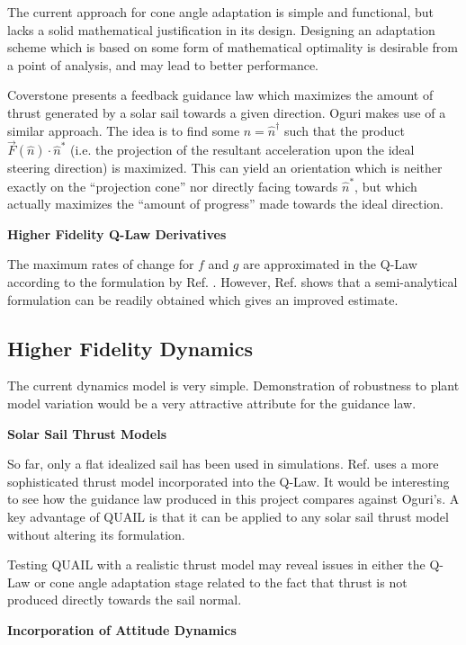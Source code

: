The current approach for cone angle adaptation is simple and functional, but lacks a solid mathematical justification in its design. Designing an adaptation scheme which is based on some form of mathematical optimality is desirable from a point of analysis, and may lead to better performance.

Coverstone \cite{coverstone2003technique} presents a feedback guidance law which maximizes the amount of thrust generated by a solar sail towards a given direction. Oguri \cite{oguri2023solar} makes use of a similar approach. The idea is to find some \(\hat{n} = \hat{n}^\dagger\) such that the product \(\vec{F}(\hat{n}) \cdot \hat{n}^*\) (i.e. the projection of the resultant acceleration upon the ideal steering direction) is maximized. This can yield an orientation which is neither exactly on the ``projection cone'' nor directly facing towards \(\hat{n}^*\), but which actually maximizes the ``amount of progress'' made towards the ideal direction.

\textbf{Higher Fidelity Q-Law Derivatives}

The maximum rates of change for \(f\) and \(g\) are approximated in the Q-Law according to the formulation by Ref. \cite{vargaperez2016}. However, Ref. \cite{sanjeev2023} shows that a semi-analytical formulation can be readily obtained which gives an improved estimate.

\subsection{Higher Fidelity Dynamics}
The current dynamics model is very simple. Demonstration of robustness to plant model variation would be a very attractive attribute for the guidance law.

\textbf{Solar Sail Thrust Models}

So far, only a flat idealized sail has been used in simulations. Ref. \cite{oguri2023solar} uses a more sophisticated thrust model incorporated into the Q-Law. It would be interesting to see how the guidance law produced in this project compares against Oguri's. A key advantage of QUAIL is that it can be applied to any solar sail thrust model without altering its formulation.

Testing QUAIL with a realistic thrust model may reveal issues in either the Q-Law or cone angle adaptation stage related to the fact that thrust is not produced directly towards the sail normal.

\textbf{Incorporation of Attitude Dynamics}

